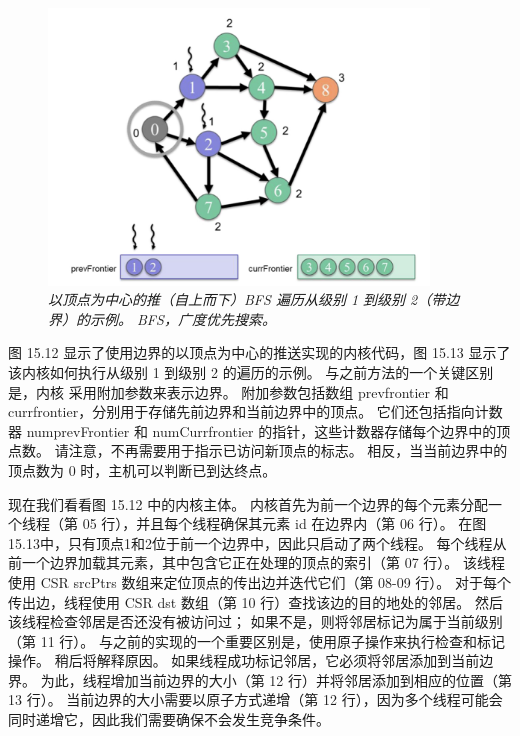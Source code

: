 \begin{figure}[H]
	\centering
	\includegraphics[width=0.9\textwidth]{figs/F15.13.png}
	\caption{\textit{以顶点为中心的推（自上而下）BFS 遍历从级别 1 到级别 2（带边界）的示例。 BFS，广度优先搜索。}}
\end{figure}

图 15.12 显示了使用边界的以顶点为中心的推送实现的内核代码，图 15.13 显示了该内核如何执行从级别 1 到级别 2 的遍历的示例。
与之前方法的一个关键区别是，内核 采用附加参数来表示边界。 
附加参数包括数组 prevfrontier 和 currfrontier，分别用于存储先前边界和当前边界中的顶点。 
它们还包括指向计数器 numprevFrontier 和 numCurrfrontier 的指针，这些计数器存储每个边界中的顶点数。 
请注意，不再需要用于指示已访问新顶点的标志。 相反，当当前边界中的顶点数为 0 时，主机可以判断已到达终点。

现在我们看看图 15.12 中的内核主体。 
内核首先为前一个边界的每个元素分配一个线程（第 05 行），并且每个线程确保其元素 id 在边界内（第 06 行）。 
在图15.13中，只有顶点1和2位于前一个边界中，因此只启动了两个线程。 
每个线程从前一个边界加载其元素，其中包含它正在处理的顶点的索引（第 07 行）。 
该线程使用 CSR srcPtrs 数组来定位顶点的传出边并迭代它们（第 08-09 行）。 
对于每个传出边，线程使用 CSR dst 数组（第 10 行）查找该边的目的地处的邻居。 然后该线程检查邻居是否还没有被访问过； 
如果不是，则将邻居标记为属于当前级别（第 11 行）。 与之前的实现的一个重要区别是，使用原子操作来执行检查和标记操作。 
稍后将解释原因。 如果线程成功标记邻居，它必须将邻居添加到当前边界。 
为此，线程增加当前边界的大小（第 12 行）并将邻居添加到相应的位置（第 13 行）。 
当前边界的大小需要以原子方式递增（第 12 行），因为多个线程可能会同时递增它，因此我们需要确保不会发生竞争条件。

